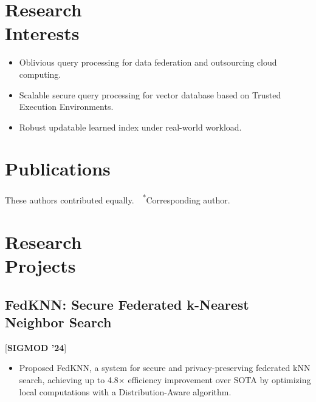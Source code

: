 \documentclass{mycv}
\begin{document}

\section{Research \\ Interests}

\begin{itemize}
  \item Oblivious query processing for data federation and outsourcing cloud computing.
  \item Scalable secure query processing for vector database based on Trusted Execution Environments.
  \item Robust updatable learned index under real-world workload.
\end{itemize}

\section{Publications}%



{
\footnotesize%
\textsuperscript{\textdagger}These authors contributed equally.~~\textsuperscript{*}Corresponding author.
}

\section{Research \\ Projects}
\subsection{FedKNN: Secure Federated k-Nearest Neighbor Search}[\textbf{SIGMOD '24}]
\begin{itemize}
  \item Proposed FedKNN, a system for secure and privacy-preserving federated kNN search, achieving up to 4.8$\times$ efficiency improvement over SOTA by optimizing local computations with a Distribution-Aware algorithm.
\end{itemize}
\end{document}
